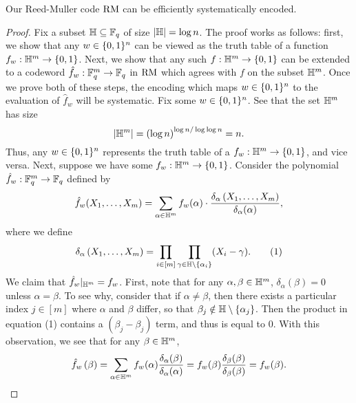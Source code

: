 \documentclass[11pt]{article}
\begin{document}
\begin{claim}{2.5}
    Our Reed-Muller code $\mathrm{RM}$ can be efficiently systematically encoded.
\end{claim}

\begin{proof}
    Fix a subset $\mathbb{H} \subseteq \mathbb{F}_q$ of size $|\mathbb{H}| = \log n$. The proof works as follows: first, we show that any $w \in \{0, 1\}^n$ can be viewed as the truth table of a function $f_w : \mathbb{H}^m \rightarrow \{0, 1\}$. Next, we show that any such $f : \mathbb{H}^m \rightarrow \{0, 1\}$ can be extended to a codeword $\hat{f}_w : \mathbb{F}_q^m \rightarrow \mathbb{F}_q$ in $\mathrm{RM}$ which agrees with $f$ on the subset $\mathbb{H}^m$. Once we prove both of these steps, the encoding which maps $w \in \{0, 1\}^n$ to the evaluation of $\hat{f}_w$ will be systematic. Fix some $w \in \{0, 1\}^n$. See that the set $\mathbb{H}^m$ has size 
    \begin{equation*}
        |\mathbb{H}^m| = \left(\log n\right)^{\log n / \log \log n} = n.
    \end{equation*}
    Thus, any $w \in \{0, 1\}^n$ represents the truth table of a $f_w : \mathbb{H}^m \rightarrow \{0, 1\}$, and vice versa. Next, suppose we have some $f_w : \mathbb{H}^m \rightarrow \{0, 1\}$. Consider the polynomial $\hat{f}_w : \mathbb{F}_q^m \rightarrow \mathbb{F}_q$ defined by 
    \begin{equation*}
        \hat{f}_w(X_1, \ldots, X_m) = \sum_{\alpha \in \mathbb{H}^m} f_w(\alpha) \cdot \frac{\delta_\alpha \left(X_1, \ldots, X_m\right)}{\delta_\alpha(\alpha)},
    \end{equation*}
    where we define 
    \begin{equation*}
        \delta_\alpha \left(X_1, \ldots, X_m\right) = \prod_{i \in [m]} \prod_{\gamma \in \mathbb{H} \setminus \{\alpha_i\}} (X_i - \gamma). \tag{1}
    \end{equation*}
    We claim that $\hat{f}_w |_{\mathbb{H}^m} = f_w$. First, note that for any $\alpha, \beta \in \mathbb{H}^m$, $\delta_{\alpha}(\beta) = 0$ unless $\alpha = \beta$. To see why, consider that if $\alpha \neq \beta$, then there exists a particular index $j \in [m]$ where $\alpha$ and $\beta$ differ, so that $\beta_j \notin \mathbb{H} \setminus \{\alpha_j\}$. Then the product in equation (1) contains a $(\beta_j - \beta_j)$ term, and thus is equal to $0$. With this observation, we see that for any $\beta \in \mathbb{H}^m$, 
    \begin{equation*}
        \hat{f}_w \left(\beta\right) = \sum_{\alpha \in \bH^m} f_w(\alpha) \frac{\delta_\alpha(\beta)}{\delta_{\alpha}(\alpha)} = f_w(\beta) \frac{\delta_\beta(\beta)}{\delta_\beta(\beta)} = f_w(\beta).

\end{equation*}
\end{proof}
\end{document}

